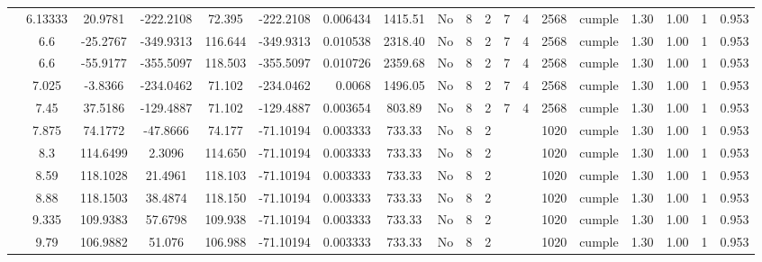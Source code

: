 \begin{table}[H]
{\begin{tabular}{|c|c|c|c|c|c|r|c|c|c|c|c|c|c|c|c|c|c|c|}
\cline{2-19}        & 6.13333 & 20.9781 & -222.2108 & 72.395 & -222.2108 & 0.006434 & 1415.51 & No  & 8   & 2   & 7   & 4   & 2568 & \cellcolor[rgb]{ .776,  .937,  .808}cumple & 1.30 & 1.00 & 1   & 0.953 \bigstrut\\
\cline{2-19}        & \cellcolor[rgb]{ .851,  .882,  .949}6.6 & -25.2767 & -349.9313 & 116.644 & -349.9313 & 0.010538 & 2318.40 & No  & 8   & 2   & 7   & 4   & 2568 & \cellcolor[rgb]{ .776,  .937,  .808}cumple & 1.30 & 1.00 & 1   & 0.953 \bigstrut\\
\cline{2-19}        & \cellcolor[rgb]{ .851,  .882,  .949}6.6 & -55.9177 & -355.5097 & 118.503 & -355.5097 & 0.010726 & 2359.68 & No  & 8   & 2   & 7   & 4   & 2568 & \cellcolor[rgb]{ .776,  .937,  .808}cumple & 1.30 & 1.00 & 1   & 0.953 \bigstrut\\
\cline{2-19}        & 7.025 & -3.8366 & -234.0462 & 71.102 & -234.0462 & 0.0068 & 1496.05 & No  & 8   & 2   & 7   & 4   & 2568 & \cellcolor[rgb]{ .776,  .937,  .808}cumple & 1.30 & 1.00 & 1   & 0.953 \bigstrut\\
\cline{2-19}        & 7.45 & 37.5186 & -129.4887 & 71.102 & -129.4887 & 0.003654 & 803.89 & No  & 8   & 2   & 7   & 4   & 2568 & \cellcolor[rgb]{ .776,  .937,  .808}cumple & 1.30 & 1.00 & 1   & 0.953 \bigstrut\\
\cline{2-19}        & 7.875 & 74.1772 & -47.8666 & 74.177 & -71.10194 & 0.003333 & 733.33 & No  & 8   & 2   &     &     & 1020 & \cellcolor[rgb]{ .776,  .937,  .808}cumple & 1.30 & 1.00 & 1   & 0.953 \bigstrut\\
\cline{2-19}        & 8.3 & 114.6499 & 2.3096 & 114.650 & -71.10194 & 0.003333 & 733.33 & No  & 8   & 2   &     &     & 1020 & \cellcolor[rgb]{ .776,  .937,  .808}cumple & 1.30 & 1.00 & 1   & 0.953 \bigstrut\\
\cline{2-19}        & 8.59 & 118.1028 & 21.4961 & 118.103 & -71.10194 & 0.003333 & 733.33 & No  & 8   & 2   &     &     & 1020 & \cellcolor[rgb]{ .776,  .937,  .808}cumple & 1.30 & 1.00 & 1   & 0.953 \bigstrut\\
\cline{2-19}        & 8.88 & 118.1503 & 38.4874 & 118.150 & -71.10194 & 0.003333 & 733.33 & No  & 8   & 2   &     &     & 1020 & \cellcolor[rgb]{ .776,  .937,  .808}cumple & 1.30 & 1.00 & 1   & 0.953 \bigstrut\\
\cline{2-19}        & 9.335 & 109.9383 & 57.6798 & 109.938 & -71.10194 & 0.003333 & 733.33 & No  & 8   & 2   &     &     & 1020 & \cellcolor[rgb]{ .776,  .937,  .808}cumple & 1.30 & 1.00 & 1   & 0.953 \bigstrut\\
\cline{2-19}        & 9.79 & 106.9882 & 51.076 & 106.988 & -71.10194 & 0.003333 & 733.33 & No  & 8   & 2   &     &     & 1020 & \cellcolor[rgb]{ .776,  .937,  .808}cumple & 1.30 & 1.00 & 1   & 0.953 \bigstrut\\

\end{tabular}}
\end{table}
